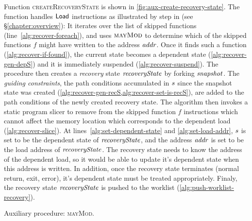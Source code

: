 Function \textsc{createRecoveryState} is shown in
\ref{fig:aux-create-recovery-state}. The function handles $\mathsf{Load}$
instructions as illustrated by step  in 
(see \S\ref{chapter:overview}):
It iterates over the list of skipped functions (line~\ref{alg:recover-foreach}),
and uses $\textsc{mayMod}$ to determine which of the skipped
functions $f$ might have written to the address $\mathit{addr}$. Once it finds
such a function (\cref{alg:recover-if-found}), the current state
becomes a dependent state (\cref{alg:recover-gen-depS}) and it is
immediately suspended (\cref{alg:recover-suspend}). 
The procedure then creates a \emph{recovery} state $\mathit{recoveryState}$ by
forking $\mathit{snapshot}$.
The \textit{guiding constraints}, \ie the path conditions accumulated in $s$
since the snapshot state was created (\cref{alg:recover-gen-recS,alg:recover-set-is-recS}),
are added to the path conditions of the newly created recovery state.
The algorithm then invokes a static program slicer to remove from the
skipped function $f$ instructions which cannot affect the memory location which corresponds to
the dependent load (\cref{alg:recover-slice}).
At lines~\ref{alg:set-dependent-state} and \ref{alg:set-load-addr},
$s$ is set to be the dependent state of $\mathit{recoveryState}$,
and the address $\mathit{addr}$ is set to be the load address of $\mathit{recoveryState}$.
The recovery state needs to know the address of the dependent load,
so it would be able to update it's dependent state when this address is written.
In addition, once the recovery state terminates (normal return, exit, error),
it's dependent state must be treated appropriately.
Finaly, the recovery state $\mathit{recoveryState}$ is pushed to the worklist (\cref{alg:push-worklist-recovery}).

\begin{algorithm}
  \caption{Auxiliary procedure: \textsc{mayMod}.
  \label{fig:aux-may-mod}}
\begin{algorithmic}[1]

     \label{alg:maymod-static}
       \label{alg:maymod-dynamic}
         \State {}
       \EndIf
    \EndIf
  \EndFor
  \State {}
\EndFunction

\end{algorithmic}
\end{algorithm}

